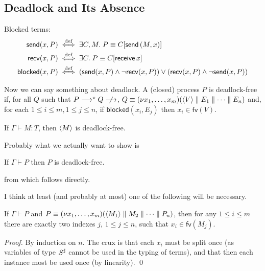 \documentclass[orivec,envcountsame]{llncs}
\begin{document}
\subsection{Deadlock and Its Absence}

Blocked terms:
\begin{align*}
  \mathsf{send}(x,P) &\stackrel{\mathrm{def}}{\iff} \exists C,M. \; P \equiv C[\mathsf{send}\,(M,x)] \\
  \mathsf{recv}(x,P) &\stackrel{\mathrm{def}}{\iff} \exists C. \; P \equiv C[\mathsf{receive}\,x] \\
  \mathsf{blocked}(x,P) &\stackrel{\mathrm{def}}{\iff} (\mathsf{send}(x,P) \land \lnot \mathsf{recv}(x,P)) \lor (\mathsf{recv}(x,P) \land \lnot \mathsf{send}(x,P))
\end{align*}

Now we can say something about deadlock.  A (closed) process $P$ is deadlock-free if, for all $Q$
such that $P \ceval^{\star} Q \centernot\ceval$, $Q \equiv (\nu x_1,\dots,x_m)(\langle V \rangle \parallel E_1 \parallel \dots \parallel E_n)$ and, for each $1 \leq i \leq m, 1 \leq j \leq n$, if
$\mathsf{blocked}(x_i,E_j)$ then $x_i \in \mathsf{fv}(V)$.

\begin{theorem}\label{thm:typed-terms-df}
  If $\Gamma \vdash M: T$, then $\langle M \rangle$ is deadlock-free.
\end{theorem}

Probably what we actually want to show is
\begin{lemma}\label{thm:typed-configs-df}
  If $\Gamma \vdash P$ then $P$ is deadlock-free.
\end{lemma}
from which  follows directly.

I think at least (and probably at most) one of the following will be necessary.

\begin{lemma}\label{thm:channel-used-twice}
  If $\Gamma \vdash P$ and $P \equiv (\nu x_1,\dots,x_m)(\langle M_1 \rangle \parallel M_2 \parallel
  \dots \parallel P_n)$, then for any $1 \leq i \leq m$ there are exactly two indexes $j$, $1 \leq j
  \leq n$, such that $x_i \in \mathsf{fv}(M_j)$.
\end{lemma}

\begin{proof}
  By induction on $n$.  The crux is that each $x_i$ must be split once (as variables of type
  $S^\sharp$ cannot be used in the typing of terms), and that then each instance most be used
  once (by linearity). \qed
\end{proof}
\end{document}
